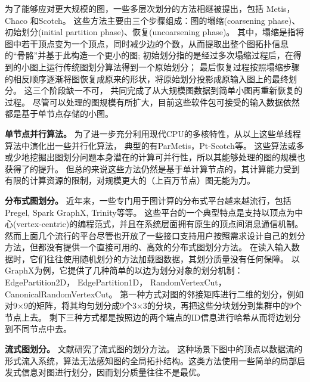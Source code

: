 \documentclass[master]{njuthesis}
\begin{document}
为了能够应对更大规模的图，一些多层次划分的方法相继被提出，包括 Metis\cite{Karypis95metis}，Chaco\cite{leland1995chaco}
和Scotch\cite{pellegrini1996scotch}。
这些方法主要由三个步骤组成：图的塌缩(coarsening phase)、初始划分(initial partition phase)、恢复(uncoarsening phase)。
其中，塌缩是指将图中若干顶点变为一个顶点，同时减少边的个数，从而提取出整个图拓扑信息的“骨骼”并基于此构造一个更小的图; 
初始划分指的是经过多次塌缩过程后，在得到的小图上运行传统图划分算法得到一个原始划分；
最后恢复过程按照塌缩步骤的相反顺序逐渐将图恢复成原来的形状，将原始划分投影成原输入图上的最终划分。
这三个阶段缺一不可， 共同完成了从大规模图数据到简单小图再重新恢复的过程。
尽管可以处理的图规模有所扩大，目前这些软件包可接受的输入数据依然都是基于单节点存储的小图。

\textbf{单节点并行算法。 } 为了进一步充分利用现代CPU的多核特性，从以上这些单线程算法中演化出一些并行化算法，
典型的有ParMetis\cite{karypis1998parallel}，Pt-Scotch\cite{chevalier2008pt}等。 
这些算法或多或少地挖掘出图划分问题本身潜在的计算可并行性，所以其能够处理的图的规模也获得了的提升。 
但总的来说这些方法仍然是基于单计算节点的，其计算能力受到有限的计算资源的限制，对规模更大的（上百万节点）图无能为力。

\textbf{分布式图划分。 } 近年来，一些专门用于图计算的分布式平台越来越流行，包括Pregel\cite{malewicz2010pregel},
Spark GraphX\cite{DBLP:conf/osdi/GonzalezXDCFS14}, Trinity\cite{shao2012trinity}等等。
这些平台的一个典型特点是支持以顶点为中心(vertex-centric)的编程范式，并且在系统层面拥有原生的顶点间消息通信机制。
然而上面几个流行的平台尽管也开放了一些接口支持用户按照需求设计自己的划分方法，但都没有提供一个直接可用的、高效的分布式图划分方法。
在读入输入数据时，它们往往使用随机划分的方法加载图数据，其划分质量没有任何保障。
以GraphX为例，它提供了几种简单的以边为划分对象的划分机制：EdgePartition2D， EdgePartition1D， RandomVertexCut，CanonicalRandomVertexCut。
第一种方式对图的邻接矩阵进行二维的划分，例如对9$\times$9的矩阵，将其均匀划分成9个3$\times3$的分块，再把这些分块划分到集群中的9个节点上去。
剩下三种方式都是按照边的两个端点的ID信息进行哈希从而将边划分到不同节点中去。

\textbf{流式图划分。} 文献\cite{DBLP:conf/wsdm/TsourakakisGRV14}\cite{DBLP:conf/kdd/StantonK12}研究了流式图的划分方法。
这种场景下图中的顶点以数据流的形式流入系统，算法无法感知图的全局拓扑结构。这类方法使用一些简单的局部启发式信息对图进行划分，因而划分质量往往不是最优。
\end{document}
